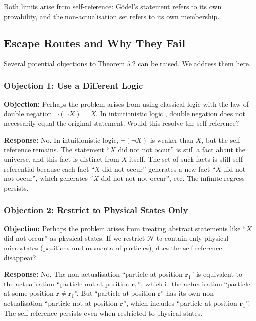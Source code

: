 \documentclass[twocolumn,10pt]{article}
\theoremstyle{definition}
\theoremstyle{remark}
\begin{document}
Both limits arise from self-reference: Gödel's statement refers to its own provability, and the non-actualisation set refers to its own membership.

\subsection{Escape Routes and Why They Fail}

Several potential objections to Theorem 5.2 can be raised. We address them here.

\subsubsection{Objection 1: Use a Different Logic}

\textbf{Objection:} Perhaps the problem arises from using classical logic with the law of double negation $\neg(\neg X) = X$. In intuitionistic logic \cite{brouwer1912}, double negation does not necessarily equal the original statement. Would this resolve the self-reference?

\textbf{Response:} No. In intuitionistic logic, $\neg(\neg X)$ is weaker than $X$, but the self-reference remains. The statement ``$X$ did not not occur'' is still a fact about the universe, and this fact is distinct from $X$ itself. The set of such facts is still self-referential because each fact ``$X$ did not occur'' generates a new fact ``$X$ did not not occur'', which generates ``$X$ did not not not occur'', etc. The infinite regress persists.

\subsubsection{Objection 2: Restrict to Physical States Only}

\textbf{Objection:} Perhaps the problem arises from treating abstract statements like ``$X$ did not occur'' as physical states. If we restrict $\mathcal{N}$ to contain only physical microstates (positions and momenta of particles), does the self-reference disappear?

\textbf{Response:} No. The non-actualisation ``particle at position $\mathbf{r}_1$'' is equivalent to the actualisation ``particle not at position $\mathbf{r}_1$'', which is the actualisation ``particle at some position $\mathbf{r} \neq \mathbf{r}_1$''. But ``particle at position $\mathbf{r}$'' has its own non-actualisation ``particle not at position $\mathbf{r}$'', which includes ``particle at position $\mathbf{r}_1$''. The self-reference persists even when restricted to physical states.
\end{document}
